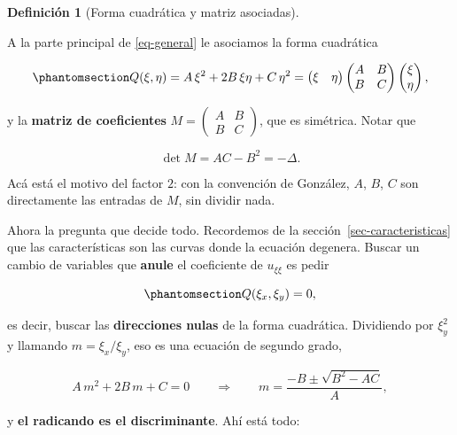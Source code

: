\documentclass[
  spanish,
  a4paper,
]{scrbook}
\theoremstyle{definition}
\newtheorem{definition}{Definición}[chapter]
\theoremstyle{plain}
\theoremstyle{definition}
\theoremstyle{plain}
\theoremstyle{definition}
\theoremstyle{remark}
\begin{document}
\begin{definition}[Forma cuadrática y matriz
asociadas]\protect\hypertarget{def-forma-cuadratica-asociada}{}\label{def-forma-cuadratica-asociada}

A la parte principal de \ref{eq-general} le asociamos la forma
cuadrática

\begin{equation}\protect\phantomsection\label{eq-Q}{
Q(\xi,\eta) = A\,\xi^2 + 2B\,\xi\eta + C\,\eta^2
= \begin{pmatrix} \xi & \eta \end{pmatrix}
\begin{pmatrix} A & B \\ B & C \end{pmatrix}
\begin{pmatrix} \xi \\ \eta \end{pmatrix},
}\end{equation}

y la \textbf{matriz de coeficientes}
\(M = \begin{pmatrix} A & B \\ B & C\end{pmatrix}\), que es simétrica.
Notar que

\[
\det M = AC - B^2 = -\Delta .
\]

\end{definition}

Acá está el motivo del factor \(2\): con la convención de González,
\(A\), \(B\), \(C\) son directamente las entradas de \(M\), sin dividir
nada.

Ahora la pregunta que decide todo. Recordemos de la
sección~\ref{sec-caracteristicas} que las características son las curvas
donde la ecuación degenera. Buscar un cambio de variables que
\textbf{anule} el coeficiente de \(u_{\xi\xi}\) es pedir

\begin{equation}\protect\phantomsection\label{eq-direcciones-nulas}{
Q(\xi_x, \xi_y) = 0 ,
}\end{equation}

es decir, buscar las \textbf{direcciones nulas} de la forma cuadrática.
Dividiendo por \(\xi_y^2\) y llamando \(m = \xi_x/\xi_y\), eso es una
ecuación de segundo grado,

\[
A\,m^2 + 2B\,m + C = 0 \qquad\Longrightarrow\qquad m = \frac{-B \pm \sqrt{B^2 - AC}}{A} ,
\]

y \textbf{el radicando es el discriminante}. Ahí está todo:
\end{document}

